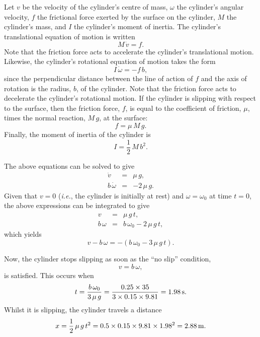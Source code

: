 \begin{figure*}[h]
\epsfysize=2in
\centerline{}
\end{figure*}

 Let $v$ be the velocity of the cylinder's centre of mass, 
$\omega$ the cylinder's angular velocity, $f$ the frictional force exerted by the
surface on the cylinder, $M$ the cylinder's mass, and $I$ the cylinder's moment of inertia. 
The cylinder's translational equation of motion is written
$$
M\,\dot{v} =  f.
$$
Note that the friction force acts to accelerate the cylinder's translational motion.
Likewise, the cylinder's rotational equation of motion takes the form
$$
I\,\dot{\omega} = - f\,b,
$$
since the perpendicular distance between the line of action of $f$ and the axis
of rotation is the radius, $b$, of the cylinder.
Note that the friction force acts to decelerate the cylinder's rotational
motion.
If the cylinder is slipping with respect to the surface, then the friction force,
$f$, is equal to the coefficient of friction, $\mu$, times the normal reaction,
$M\,g$, at the surface:
$$
f = \mu\,M\,g.
$$
Finally, the moment of inertia of the cylinder is
$$
I = \frac{1}{2}\,M\,b^2.
$$

The above equations can be solved to give
\begin{eqnarray}
\dot{v} &=& \mu\,g,\nonumber\\[0.5ex]
b\,\dot{\omega} &=& - 2\,\mu\,g.\nonumber
\end{eqnarray}
Given that $v=0$ ({\em i.e.}, the cylinder
is initially at rest) and $\omega=\omega_0$ at time $t=0$, the above
expressions can be integrated to give
\begin{eqnarray}
v &=& \mu\,g\,t,\nonumber\\[0.5ex]
b\,\omega &=& b\,\omega_0 - 2\,\mu\,g\,t,\nonumber
\end{eqnarray}
which yields
$$
v - b\,\omega = -(b\,\omega_0 - 3\,\mu\,g\,t).
$$

Now, the cylinder stops slipping as soon as the ``no slip'' condition,
$$
v = b\,\omega,
$$
is  satisfied. This occurs when
$$
t = \frac{b\,\omega_0}{3\,\mu\,g}=\frac{0.25\times 35}{3\times 0.15\times 9.81} = 1.98\,{\rm s}.
$$
Whilst it is slipping, the cylinder travels a distance
$$
x = \frac{1}{2}\,\mu\,g\,t^2 = 0.5\times 0.15 \times 9.81\times 1.98^2=2.88\,{\rm m}.
$$

